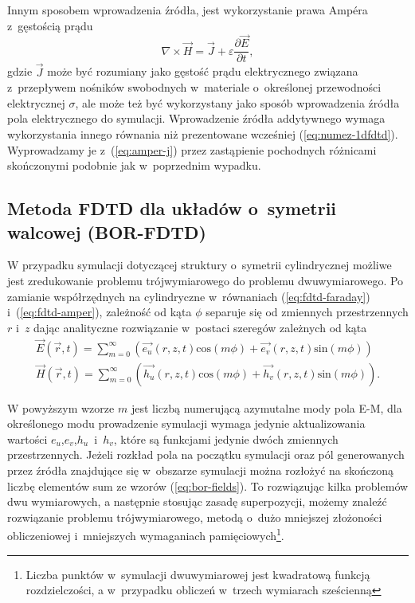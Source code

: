 Innym sposobem wprowadzenia źródła, jest wykorzystanie prawa Amp\'{e}ra z~gęstością prądu
\begin{equation}
\nabla \times \vec{H} = \vec{J} + \varepsilon \frac{\partial \vec{E}}{\partial t},
\label{eq:amper-j}
\end{equation}
gdzie $\vec{J}$ może być rozumiany jako gęstość prądu elektrycznego związana z~przepływem nośników swobodnych w~materiale o~określonej przewodności elektrycznej $\sigma$, ale może też być wykorzystany jako sposób wprowadzenia źródła pola elektrycznego do symulacji. Wprowadzenie źródła addytywnego wymaga wykorzystania innego równania niż prezentowane wcześniej (\ref{eq:numez-1dfdtd}). Wyprowadzamy je z~(\ref{eq:amper-j}) przez zastąpienie pochodnych różnicami skończonymi podobnie jak w~poprzednim wypadku. 



\subsection{Metoda FDTD dla układów o~symetrii walcowej (BOR-FDTD)}
\label{subart:borfdtd}
W przypadku symulacji dotyczącej struktury o~symetrii cylindrycznej możliwe jest zredukowanie problemu trójwymiarowego do problemu dwuwymiarowego. Po zamianie współrzędnych na cylindryczne w~równaniach (\ref{eq:fdtd-faraday}) i~(\ref{eq:fdtd-amper}), zależność od kąta $\phi$ separuje się od zmiennych przestrzennych $r$ i~$z$ dając analityczne rozwiązanie w~postaci szeregów zależnych od kąta
\begin{equation}
	\begin{gathered}
	\vec{E}(\vec{r},t)=\sum_{m=0}^{\infty}(\vec{e_u}(r,z,t) \textrm{cos}(m\phi)+\vec{e_v}(r,z,t)\textrm{sin}(m\phi)) \\
	\vec{H}(\vec{r},t)=\sum_{m=0}^{\infty}(\vec{h_u}(r,z,t) \textrm{cos}(m\phi)+\vec{h_v}(r,z,t)\textrm{sin}(m\phi)).
	\end{gathered}
	\label{eq:bor-fields}
\end{equation}

W powyższym wzorze $m$ jest liczbą numerującą azymutalne mody pola E-M, dla określonego modu prowadzenie symulacji wymaga jedynie aktualizowania wartości $e_u$,$e_v$,$h_u$~i~$h_v$, które są funkcjami jedynie dwóch zmiennych przestrzennych. Jeżeli rozkład pola na początku symulacji oraz pól generowanych przez źródła znajdujące się w~obszarze symulacji można rozłożyć na skończoną liczbę elementów sum ze wzorów (\ref{eq:bor-fields}). To rozwiązując kilka problemów dwu wymiarowych, a następnie stosując zasadę superpozycji, możemy znaleźć rozwiązanie problemu trójwymiarowego, metodą o~dużo mniejszej złożoności obliczeniowej i~mniejszych wymaganiach pamięciowych\footnote{Liczba punktów w~symulacji dwuwymiarowej jest kwadratową funkcją rozdzielczości, a w~przypadku obliczeń w~trzech wymiarach sześcienną}.

